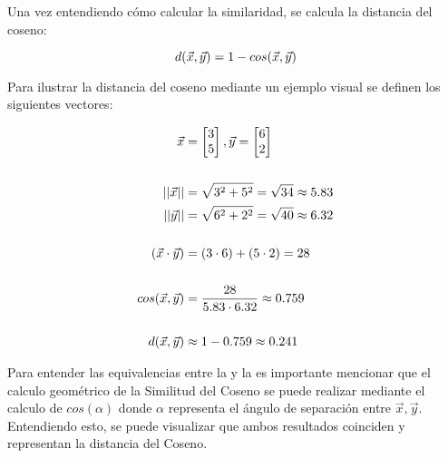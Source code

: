     Una vez entendiendo cómo calcular la similaridad, se calcula la distancia del coseno:
    
    \begin{equation}
        d(\vec{x}, \vec{y}) = 1 - cos(\vec{x}, \vec{y})
        \addequation{Definición de Distancia del Coseno}
    \end{equation}

    Para ilustrar la distancia del coseno mediante un ejemplo visual se definen los siguientes vectores:

    \begin{equation}
        \begin{split}
            \vec{x} &= \begin{bmatrix}
                3
                \\
                5
            \end{bmatrix},  
            \vec{y} = \begin{bmatrix}
                6
                \\
                2
            \end{bmatrix}
            \\
            \\
            || \vec{x} || &= \sqrt{3^2 + 5^2} = \sqrt{34} \approx 5.83
            \\
            || \vec{y} || &= \sqrt{6^2 + 2^2} = \sqrt{40} \approx 6.32
            \\
            \\
            ( \vec{x} \cdot \vec{y} )&=(3 \cdot  6)+(5 \cdot 2)=28
            \\
            \\
            cos(\vec{x}, \vec{y}) & = \frac{28}{5.83 \cdot 6.32} \approx 0.759
            \\
            \\
            d(\vec{x}, \vec{y}) &\approx 1 - 0.759 \approx  0.241
        \end{split}
        \addequation{Ejemplo de Distancia del Coseno}
        \label{eq:EjemploCoseno}
    \end{equation}

    \newpage

    Para entender las equivalencias entre la  y la  es importante mencionar que el calculo geométrico de la Similitud del Coseno se puede realizar mediante el calculo de $cos(\alpha)$ donde $\alpha$ representa el ángulo de separación entre $\vec{x}, \vec{y}$. Entendiendo esto, se puede visualizar que ambos resultados coinciden y representan la distancia del Coseno.

